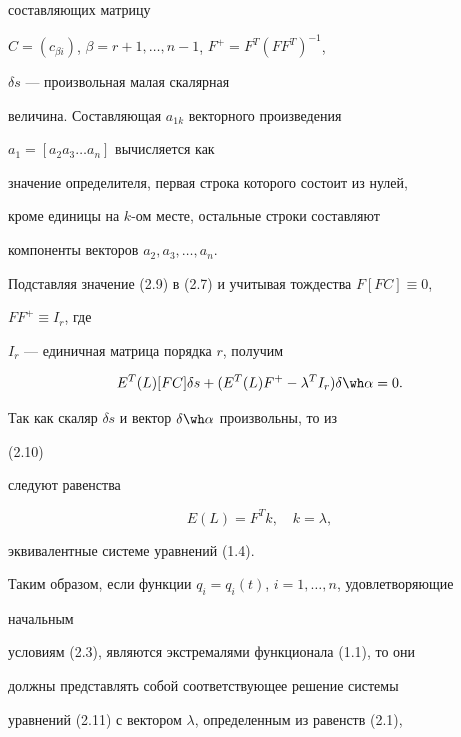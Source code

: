 составляющих матрицу 


$C=(c_{\beta i})$, $\beta=r+1,\dotsc,n-1$, $F^+=F^T(F F^T)^{-1}$, 


$\delta s$ --- произвольная малая скалярная 


величина. Составляющая $a_{1k}$ векторного произведения 


$a_1=[a_2a_3\dotsc a_n]$ вычисляется как 


значение определителя, первая строка которого состоит из нулей, 


кроме единицы на $k$-ом месте, остальные строки составляют 


компоненты векторов $a_2,a_3,\dotsc,a_n$. 


 


Подставляя значение (2.9) в (2.7) и учитывая тождества $F[FC]\equiv0$, 


$F F^+\equiv I_r$, где 


$I_r$ --- единичная матрица порядка $r$, получим 


\begin{equation} 


E^T(L)[FC]\delta s+(E^T(L)F^+-\lambda^T I_r)\delta\wh\alpha=0. 


\end{equation} 


 


Так как скаляр $\delta s$ и вектор $\delta\wh\alpha$ произвольны, то из 


(2.10) 


следуют равенства 


\begin{equation} 


E(L)=F^T k,\quad k=\lambda, 


\end{equation} 


эквивалентные системе уравнений (1.4). 


 


Таким образом, если функции $q_i=q_i(t)$, $i=1,\dotsc,n$, удовлетворяющие 


начальным 


условиям (2.3), являются экстремалями функционала (1.1), то они 


должны представлять собой соответствующее решение системы 


уравнений (2.11) с вектором $\lambda$, определенным из равенств (2.1), 


